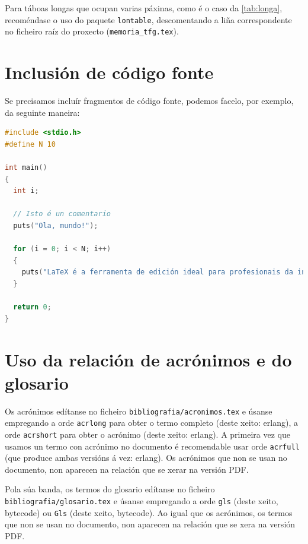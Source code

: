 Para táboas longas que ocupan varias páxinas, como é o caso da \ref{tab:longa},
recoméndase o uso do paquete \texttt{lontable}, descomentando a liña
correspondente no ficheiro raíz do proxecto (\verb+memoria_tfg.tex+).



\section{Inclusión de código fonte}

Se precisamos incluír fragmentos de código fonte, podemos facelo, por exemplo,
da seguinte maneira:

\begin{lstlisting}[language=C]
#include <stdio.h>
#define N 10

int main()
{
  int i;

  // Isto é un comentario
  puts("Ola, mundo!");

  for (i = 0; i < N; i++)
  {
    puts("LaTeX é a ferramenta de edición ideal para profesionais da informática!");
  }

  return 0;
}
\end{lstlisting}

\section{Uso da relación de acrónimos e do glosario}

Os acrónimos edítanse no ficheiro \texttt{bibliografia/acronimos.tex} e úsanse
empregando a orde \texttt{acrlong} para obter o termo completo (deste xeito:
\acrlong{erlang}), a orde \texttt{acrshort} para obter o acrónimo (deste xeito:
\acrshort{erlang}). A primeira vez que usamos un termo con acrónimo no
documento é recomendable usar orde \texttt{acrfull} (que produce ambas versións
á vez: \acrfull{erlang}). Os acrónimos que non se usan no documento, non
aparecen na relación que se xerar na versión PDF.

Pola súa banda, os termos do glosario edítanse no ficheiro
\texttt{bibliografia/glo\-sa\-rio.tex} e úsanse empregando a orde \texttt{gls}
(deste xeito, \gls{bytecode}) ou \texttt{Gls} (deste xeito, \Gls{bytecode}). Ao
igual que os acrónimos, os termos que non se usan no documento, non aparecen na
relación que se xera na versión PDF.
